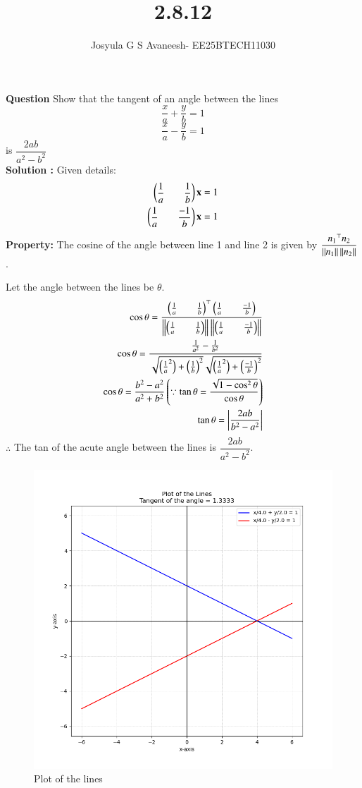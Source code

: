 \documentclass[journal]{IEEEtran}
\theoremstyle{remark}
\begin{document}

\onecolumn

\title{2.8.12}
\author{Josyula G S Avaneesh- EE25BTECH11030}
\maketitle


\renewcommand{\thefigure}{\theenumi}
\renewcommand{\thetable}{\theenumi}
\textbf{Question} Show that the tangent of an angle between the lines
$$\frac{x}{a}+\frac{y}{b}=1$$
$$\frac{x}{a}-\frac{y}{b}=1$$
is $\dfrac{2ab}{a^2-b^2}$\\
\textbf{Solution :} Given details:
\begin{align}
   \begin{pmatrix}\dfrac{1}{a}&&\dfrac{1}{b}\end{pmatrix}\mathbf{x}=1\\
   \begin{pmatrix}\dfrac{1}{a}&&\dfrac{-1}{b}\end{pmatrix}\mathbf{x}=1
\end{align}
\textbf{Property:} The cosine of the angle between line 1 and line 2 is given by $\dfrac{{n_1}^\top n_2}{\left\lVert n_1\right\rVert\left\lVert n_2\right\rVert} $.

Let the angle between the lines be $\theta$.
\begin{align}
   \cos\theta=\dfrac{{\begin{pmatrix}\frac{1}{a}&&\frac{1}{b}\end{pmatrix}}^\top \begin{pmatrix}\frac{1}{a} && \frac{-1}{b}\end{pmatrix}}{{\left\lVert\begin{pmatrix}\frac{1}{a}&&\frac{1}{b}\end{pmatrix}\right\rVert}\left\lVert\begin{pmatrix}\frac{1}{a}&&\frac{-1}{b}\end{pmatrix}\right\rVert}\\
   \cos\theta=\frac{\frac{1}{a^2}-\frac{1}{b^2}}{\sqrt{\left({\frac{1}{a}}^2\right)+\left(\frac{1}{b}\right)^2}\sqrt{\left({\frac{1}{a}}^2\right)+\left(\frac{-1}{b}\right)^2}}\\
   \cos\theta=\frac{b^2-a^2}{a^2+b^2}
   \left(\because \tan\theta=\frac{\sqrt{1-\cos^2\theta}}{\cos\theta}\right)\\
   \tan\theta=\left|\frac{2ab}{b^2-a^2}\right|
\end{align}
$\therefore$ The tan of the acute angle between the lines is $\dfrac{2ab}{a^2-b^2}$.
\begin{figure}[H]
    \centering
    \includegraphics[width=1\columnwidth]{figs/line.png}
    \caption{Plot of the lines}
    \label{fig:placeholder_1}
\end{figure}
\end{document}
